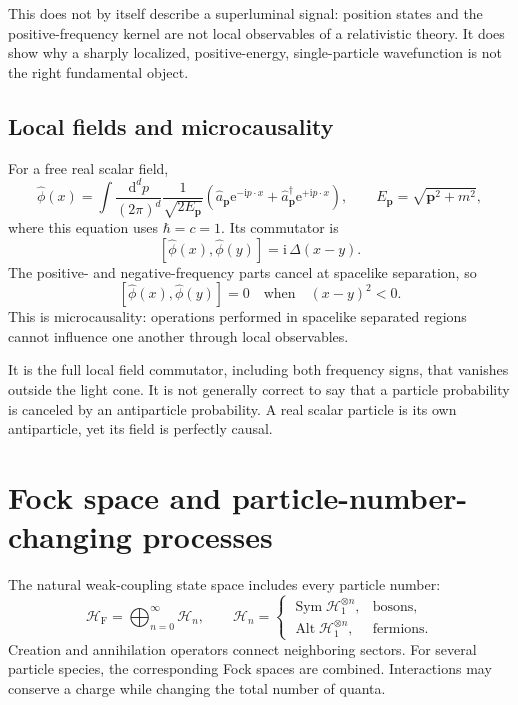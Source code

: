 \documentclass[11pt]{article}
\newcommand{\dd}{\mathrm{d}}
\newcommand{\e}{\mathrm{e}}
\newcommand{\ii}{\mathrm{i}}
\newcommand{\cH}{\mathcal{H}}
\newcommand{\comm}[2]{\left[#1,#2\right]}
\begin{document}
This does not by itself describe a superluminal signal: position states and
the positive-frequency kernel are not local observables of a relativistic
theory.  It does show why a sharply localized, positive-energy,
single-particle wavefunction is not the right fundamental object.

\subsection{Local fields and microcausality}

For a free real scalar field,
\begin{equation}
  \hat\phi(x)
  =\int\frac{\dd^d p}{(2\pi)^d}
   \frac{1}{\sqrt{2E_{\bm p}}}
  \left(
    \hat a_{\bm p}\e^{-\ii p\cdot x}
    +\hat a^\dagger_{\bm p}\e^{+\ii p\cdot x}
  \right),
  \qquad
  E_{\bm p}=\sqrt{\bm p^2+m^2},
  \label{eq:modeexpansion}
\end{equation}
where this equation uses $\hbar=c=1$.  Its commutator is
\begin{equation}
  \comm{\hat\phi(x)}{\hat\phi(y)}
  =\ii\,\Delta(x-y).
  \label{eq:PauliJordan}
\end{equation}
The positive- and negative-frequency parts cancel at spacelike separation,
so
\begin{equation}
  \boxed{
  \comm{\hat\phi(x)}{\hat\phi(y)}=0
  \quad\text{when}\quad
  (x-y)^2<0.
  }
  \label{eq:microcausality}
\end{equation}
This is microcausality: operations performed in spacelike separated regions
cannot influence one another through local observables.

\begin{warningbox}
It is the full local field commutator, including both frequency signs, that
vanishes outside the light cone.  It is not generally correct to say that a
particle probability is canceled by an antiparticle probability.  A real
scalar particle is its own antiparticle, yet its field is perfectly causal.
\end{warningbox}

\section{Fock space and particle-number-changing processes}

The natural weak-coupling state space includes every particle number:
\begin{equation}
  \cH_{\mathrm F}
  =
  \bigoplus_{n=0}^{\infty}\cH_n,
  \qquad
  \cH_n=
  \begin{cases}
    \operatorname{Sym}\cH_1^{\otimes n}, & \text{bosons},\\
    \operatorname{Alt}\cH_1^{\otimes n}, & \text{fermions}.
  \end{cases}
  \label{eq:Fock}
\end{equation}
Creation and annihilation operators connect neighboring sectors.  For
several particle species, the corresponding Fock spaces are combined.
Interactions may conserve a charge while changing the total number of
quanta.
\end{document}
